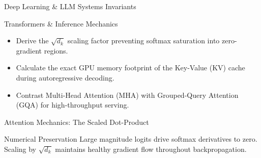 
\begin{frame}{Deep Learning \& LLM Systems Invariants}
  \begin{LearningGoals}{Transformers \& Inference Mechanics}
    \begin{itemize}\setlength{\itemsep}{.35em}
      \item Derive the \(\sqrt{d_k}\) scaling factor preventing softmax saturation into zero-gradient regions.
      \item Calculate the exact GPU memory footprint of the Key-Value (KV) cache during autoregressive decoding.
      \item Contrast Multi-Head Attention (MHA) with Grouped-Query Attention (GQA) for high-throughput serving.
    \end{itemize}
  \end{LearningGoals}
  \vspace{.15cm}
\end{frame}

\begin{frame}{Attention Mechanics: The Scaled Dot-Product}
  \vspace{.15cm}
  \begin{ConceptCard}{Numerical Preservation}
    Large magnitude logits drive softmax derivatives to zero. Scaling by \(\sqrt{d_k}\) maintains healthy gradient flow throughout backpropagation.
  \end{ConceptCard}
\end{frame}

